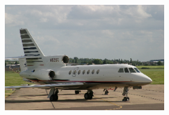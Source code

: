 \documentclass{article} %
\begin{document}
\begin{figure}

	\begin{subfigure}[c]{\textwidth}
		\centering
		\begin{subfigure}[c]{0.195\textwidth}
			\includegraphics[width = \textwidth]{./img/4_1_s.png}

\end{subfigure}
\end{subfigure}
\end{figure}
\end{document}
